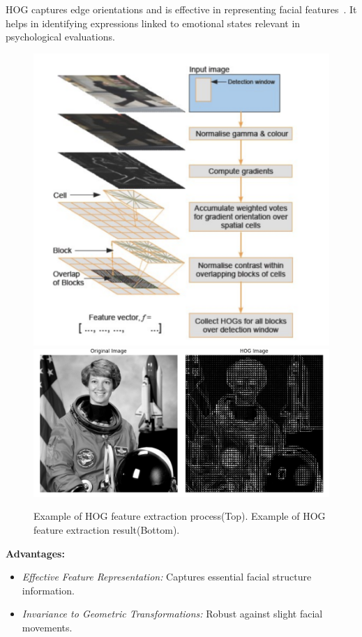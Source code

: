 \documentclass[lettersize,journal]{IEEEtran}
\begin{document}
HOG captures edge orientations and is effective in representing facial features~\cite{Dalal2005}. It helps in identifying expressions linked to emotional states relevant in psychological evaluations.
\begin{figure}[htbp]
    \centering
    \includegraphics[width=0.7\linewidth]{Traditional FER/HOG_process.png} \\
    \includegraphics[width=0.7\linewidth]{Traditional FER/HOG_result.png}
    \caption{Example of HOG feature extraction process(Top).  Example of HOG feature extraction result(Bottom)\cite{van2014scikit}.}
    \label{fig:lbp_combined}
\end{figure}
\textbf{Advantages:}
\begin{itemize}
    \item \emph{Effective Feature Representation:} Captures essential facial structure information.
    \item \emph{Invariance to Geometric Transformations:} Robust against slight facial movements.
\end{itemize}
\end{document}
